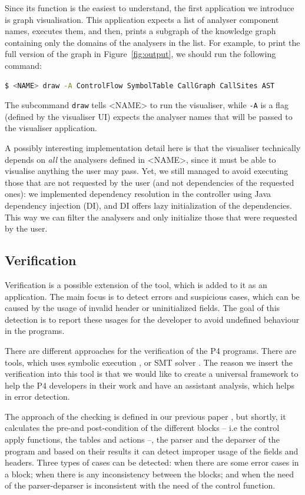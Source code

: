 \documentclass[sigconf]{acmart}
\begin{document}
  Since its function is the easiest to understand, the first application we introduce is graph visualisation. This application expects a list of analyser component names, executes them, and then, prints a subgraph of the knowledge graph containing only the domains of the analysers in the list. For example, to print the full version of the graph in Figure~\ref{fig:output}, we should run the following command:

  \begin{lstlisting}[language=bash, basicstyle=\scriptsize]
  $ <NAME> draw -A ControlFlow SymbolTable CallGraph CallSites AST
\end{lstlisting}

  The subcommand \texttt{draw} tells <NAME> to run the visualiser, while \texttt{-A} is a flag (defined by the visualiser UI) expects the analyser names that will be passed to the visualiser application. 

  A possibly interesting implementation detail here is that the visualiser technically depends on \textit{all} the analysers defined in <NAME>, since it must be able to visualise anything the user may pass. Yet, we still managed to avoid executing those that are not requested by the user (and not dependencies of the requested ones): we implemented dependency resolution in the controller using Java dependency injection (DI), and DI offers lazy initialization of the dependencies. This way we can filter the analysers and only initialize those that were requested by the user.

  \subsection{Verification} %
  Verification is a possible extension of the tool, which is added to it as an application. The main focus is to detect errors and suspicious cases, which can be caused by the usage of invalid header or uninitialized fields. The goal of this detection is to report these usages for the developer to avoid undefined behaviour in the programs. 
  
  There are different approaches for the verification of the P4 programs. There are tools, which uses symbolic execution \cite{vera}, or SMT solver \cite{p4v, bf4}. The reason we insert the verification into this tool is that we would like to create a universal framework to help the P4 developers in their work and have an assistant analysis, which helps in error detection. 
  
  The approach of the checking is defined in our previous paper \cite{ownCheck}, but shortly, it calculates the pre-and post-condition of the different blocks -- i.e the control apply functions, the tables and actions --, the parser and the deparser of the program and based on their results it can detect improper usage of the fields and headers. Three types of cases can be detected: when there are some error cases in a block; when there is any inconsistency between the blocks; and when the need of the parser-deparser is inconsistent with the need of the control function.
  
\end{document}
